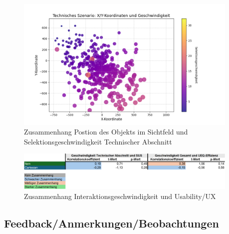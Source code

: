    \begin{figure}[tbh]
    \centering
   \includegraphics[width=0.95\textwidth]{images/Results/bubbleplot-technisch.png}
    \caption{Zusammenhang Postion des Objekts im Sichtfeld und Selektionsgeschwindigkeit Technischer Abschnitt}
    \label{fig:bubbleKorrPosGeschwindigkeitTechnisch}
   \end{figure}

   \begin{figure}[tbh]
    \centering
   \includegraphics[width=0.95\textwidth]{images/Results/Korrelationen-Rest.png}
    \caption{Zusammenhang Interaktionsgeschwindigkeit und Usability/UX}
    \label{fig:TableKorrelationen}
   \end{figure}

\subsection{Feedback/Anmerkungen/Beobachtungen}



